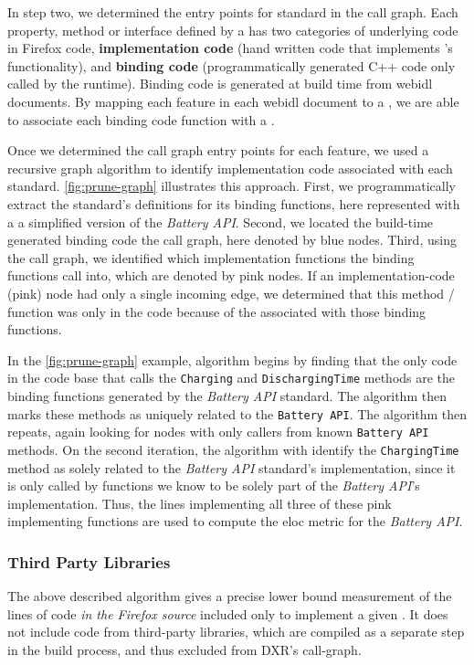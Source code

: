 In step two, we determined the entry points for standard in the call
graph.  Each property, method or interface defined by a \WAS has two categories
of underlying code in Firefox code, \textbf{implementation code}
(hand written code that implements \WAS's functionality), and \textbf{binding
code} (programmatically generated C++ code only called by the \JS runtime).
Binding code is generated at build time from \gls{webidl} documents. By
mapping each feature in each \gls{webidl} document to a \WAS, we are able to
associate each binding code function with a \WAS.



Once we determined the call graph entry points for each \WAPI feature, we used
a recursive graph algorithm to identify implementation code associated with
each standard.  \ref{fig:prune-graph} illustrates this approach.  First, we
programmatically extract the standard's definitions for its binding functions,
here represented with a a simplified version of the \textit{Battery API}. Second,
we located the build-time generated binding code the \FF call graph, here
denoted by blue nodes.  Third, using the call graph, we identified which
implementation functions the binding functions call into, which are denoted by
pink nodes.  If an implementation-code (pink) node had only a single incoming edge,
we determined that this method / function was only in the code because of
the \WAS associated with those binding functions.

In the \ref{fig:prune-graph} example, algorithm begins by finding that the only
code in the \FF code base that calls the \texttt{Charging} and
\texttt{DischargingTime} methods are the binding functions generated by the
\textit{Battery API} standard.  The algorithm then marks these methods as
uniquely related to the \texttt{Battery API}.  The algorithm then repeats,
again looking for nodes with only callers from known \texttt{Battery API}
methods.  On the second iteration, the algorithm with identify the
\texttt{ChargingTime} method as solely related to the \textit{Battery API}
standard's implementation, since it is only called by functions we know to be
solely part of the \textit{Battery API}'s implementation. Thus, the lines
implementing all three of these pink implementing functions are used to compute
the \gls{eloc} metric for the \textit{Battery API}.


\subsubsection{Third Party Libraries}
\label{cost-benefit:methodology:third-party-libraries}
The above described algorithm gives a precise lower bound measurement of the
lines of code \emph{in the Firefox source} included only to implement a given
\WAS.  It does not include code from third-party libraries, which are compiled
as a separate step in the \FF build process, and thus excluded from DXR's
call-graph.

